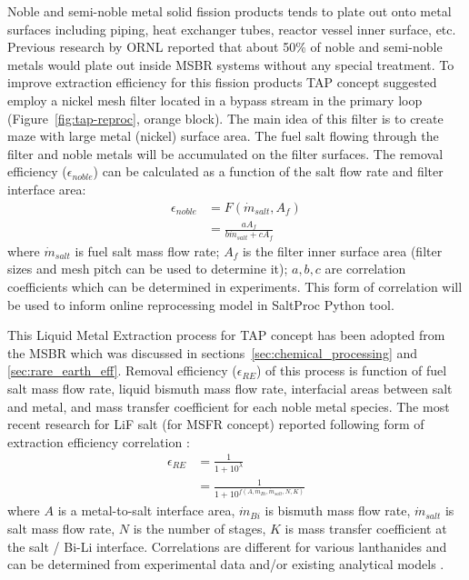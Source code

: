 Noble and semi-noble metal solid fission products tends to plate out onto metal 
surfaces including piping, heat exchanger tubes, reactor vessel inner surface, etc. 
Previous research by \gls{ORNL} \cite{robertson_conceptual_1971} reported that 
about 50\% of noble and semi-noble metals would plate out inside \gls{MSBR} 
systems without any special treatment. To improve extraction efficiency for this 
fission products \gls{TAP} concept suggested employ a nickel mesh filter located 
in a bypass stream in the primary loop (Figure~\ref{fig:tap-reproc}, orange block). 
The main idea of this filter is to create maze with large metal (nickel) 
surface area. The fuel salt flowing through the filter and noble 
metals will be accumulated on the filter surfaces. The removal efficiency 
($\epsilon_{noble}$) can be 
calculated as a function of the salt flow rate and filter interface area:
\begin{align} 
\epsilon_{noble} &= F(\dot{m}_{salt}, A_f) \\
&= \frac{a A_f}{b \dot{m}_{salt} + c A_f} \label{eq:filter_eff}
\end{align}
where $\dot{m}_{salt}$ is fuel salt mass flow rate; $A_f$ is the filter inner 
surface area (filter sizes and mesh pitch can be used to determine it); 
$a, b, c$ are correlation coefficients which can be determined in experiments. 
This form of correlation will be used 
to inform online reprocessing model in SaltProc Python tool.

This Liquid Metal Extraction process for \gls{TAP} concept has been adopted from 
the \gls{MSBR} which was discussed in sections~\ref{sec:chemical_processing} and \ref{sec:rare_earth_eff}. Removal efficiency ($\epsilon_{RE}$) of this process 
is function 
of fuel salt mass flow rate, liquid bismuth mass flow rate, interfacial areas 
between salt and metal, and mass transfer coefficient for each noble metal species. 
The most recent 
research for LiF salt (for \gls{MSFR} concept) reported following form of 
extraction efficiency correlation \cite{rodrigues_actinide/lanthanide_2015}:
\begin{align} 
\epsilon_{RE} &= \frac{1}{1+10^{\lambda}} \\
&= \frac{1}{1+10^{f(A, \dot{m}_{Bi}, \dot{m}_{salt}, N, K)}} \label{eq:re_eff}
\end{align}
where $A$ is a metal-to-salt interface area, $\dot{m}_{Bi}$ is bismuth mass 
flow rate, $\dot{m}_{salt}$ is salt mass flow rate, $N$ is the number of stages, 
$K$ is mass transfer coefficient at the salt / Bi-Li interface. Correlations are 
different for various lanthanides and can be determined from experimental data 
and/or existing analytical models \cite{mcneese_engineering_1971, simon_-line_2008, rodrigues_actinide/lanthanide_2015, delpech_reactor_2009, delpech_possible_2012}.

